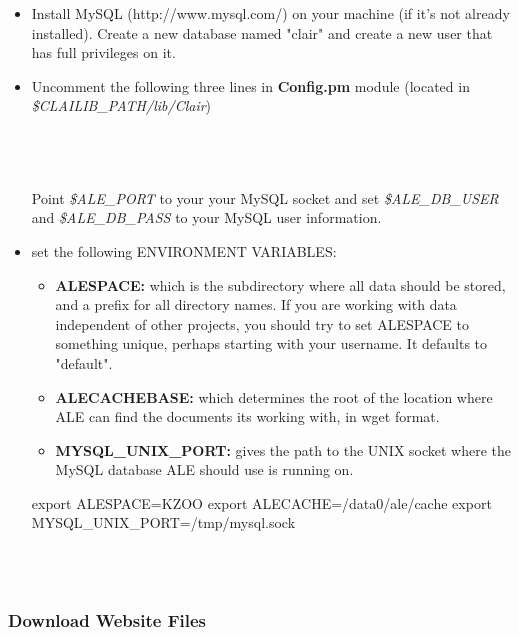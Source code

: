 \begin{itemize}
\item Install MySQL (http://www.mysql.com/) on your machine (if it's not already installed). Create a new database named "clair" and create a new user that has full privileges on it.

\item Uncomment the following three lines in \textbf{Config.pm} module (located in \emph{\$CLAILIB\_PATH/lib/Clair})
\\
\\
\\
\\
Point \emph{\$ALE\_PORT} to your your MySQL socket and set \emph{\$ALE\_DB\_USER} and \emph{\$ALE\_DB\_PASS} to your MySQL user information.

\item set the following ENVIRONMENT VARIABLES:

\begin{itemize}
  \item \textbf{ALESPACE:} which is the subdirectory where all data should be stored, and a prefix for all directory names. If you are working with data independent of other projects, you should try to set ALESPACE to something unique, perhaps starting with your username. It defaults to "default".
  \item \textbf{ALECACHEBASE:} which determines the root of the location where ALE can find the documents its working with, in wget format.
  \item \textbf{MYSQL\_UNIX\_PORT:} gives the path to the UNIX socket where the MySQL database ALE should use is running on.
\end{itemize}

\begin{boxedverbatim}
 export ALESPACE=KZOO
 export ALECACHE=/data0/ale/cache
 export MYSQL_UNIX_PORT=/tmp/mysql.sock
\end{boxedverbatim}
\\
\\
\end{itemize}

\subsubsection{Download Website Files}

